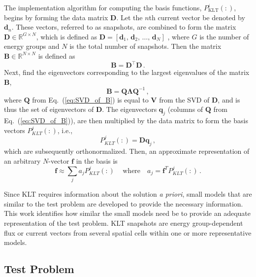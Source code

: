 \documentclass[5p,times,twocolumn,10pt]{elsarticle}
\newcommand{\EQ}[1]{Eq.~(\ref{#1})}               %
\begin{document}
The implementation algorithm for computing the basis 
functions, $P^i_{\text{KLT}}(:)$, begins by forming the data matrix 
$\mathbf{D}$.  Let the $n$th current vector be denoted by 
$\mathbf{d}_n$.  These 
vectors, referred to as snapshots, are combined to form the 
matrix $\mathbf{D} \in \mathbb{R}^{G\times N}$, which is defined as $\mathbf{D} 
= [\mathbf{d}_1,\, \mathbf{d}_2,\, \ldots, \, \mathbf{d}_N]$  
\cite{Meyer2002}, where $G$ is the number of energy groups and $N$ is the total
number of snapshots. Then the matrix 
$\mathbf{B} \in \mathbb{R}^{N\times N}$ is defined as
\begin{equation}
    \mathbf{B} = \mathbf{D}^{\intercal}\mathbf{D} \, .
    \label{eq:KLT}
\end{equation}
Next, find the eigenvectors corresponding to the largest eigenvalues of the 
matrix 
$\mathbf{B}$,
\begin{equation}
    \label{eq:SVD_of_B}
    \mathbf{B} = \mathbf{Q}\mathbf{\Lambda}\mathbf{Q}^{-1}\, ,
\end{equation}
where $\mathbf{Q}$ from \EQ{eq:SVD_of_B} is equal 
to $\mathbf{V}$ 
from the SVD of $\mathbf{D}$, and is thus the set of 
eigenvectors of 
$\mathbf{D}$. The eigenvectors $\mathbf{q}_j$ (columns of $\mathbf{Q}$ from 
\EQ{eq:SVD_of_B}), are 
then multiplied by the data matrix to form the basis vectors $P^j_{KLT}(:)$, 
i.e.,
\begin{equation}
    P^j_{KLT}(:) = \mathbf{D}\mathbf{q}_j \, ,
\end{equation}
which are subsequently orthonormalized.  Then, an approximate representation of 
an arbitrary $N$-vector $\mathbf{f}$ in the basis is 
\begin{equation}
    \mathbf{f} \approx \sum_j a_j P^j_{KLT}(:) \, \quad \text{where} \quad a_j 
    = 
    \mathbf{f}^T P^j_{KLT}(:) \, .
    \label{eq:KLT_def}
\end{equation}

Since KLT requires information about the solution {\it a priori}, small models 
that are similar to the test problem are developed to provide the necessary 
information.  This work identifies how similar the small models need be to 
provide an adequate representation of the test problem. KLT snapshots are 
energy group-dependent flux or current vectors from several spatial cells within 
one or more representative models. 
\subsection{Test Problem}
\end{document}
